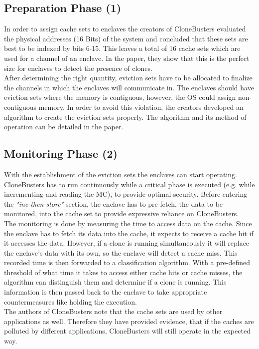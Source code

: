\subsection{Preparation Phase (1)}
In order to assign cache sets to enclaves the creators of CloneBusters evaluated the physical addresses (16 Bits) of the system and concluded that these sets are best to be indexed by bits 6-15. This leaves a total of 16 cache sets which are used for a channel of an enclave. In the paper, they show that this is the perfect size for enclaves to detect the presence of clones.\\
After determining the right quantity, eviction sets have to be allocated to finalize the channels in which the enclaves will communicate in. The enclaves should have eviction sets where the memory is contiguous, however, the OS could assign non-contiguous memory. In order to avoid this violation, the creators developed an algorithm to create the eviction sets properly. The algorithm and its method of operation can be detailed in the paper.

\subsection{Monitoring Phase (2)}
With the establishment of the eviction sets the enclaves can start operating. CloneBusters has to run continuously while a critical phase is executed (e.g. while incrementing and reading the MC), to provide optimal security. Before entering the \textit{"inc-then-store"} section, the enclave has to pre-fetch, the data to be monitored, into the cache set to provide expressive reliance on CloneBusters. \\
The monitoring is done by measuring the time to access data on the cache. Since the enclave has to fetch its data into the cache, it expects to receive a cache hit if it accesses the data. However, if a clone is running simultaneously it will replace the enclave's data with its own, so the enclave will detect a cache miss. This recorded time is then forwarded to a classification algorithm. With a pre-defined threshold of what time it takes to access either cache hits or cache misses, the algorithm can distinguish them and determine if a clone is running. This information is then passed back to the enclave to take appropriate countermeasures like holding the execution.\\
The authors of CloneBusters note that the cache sets are used by other applications as well. Therefore they have provided evidence, that if the caches are polluted by different applications, CloneBusters will still operate in the expected way.